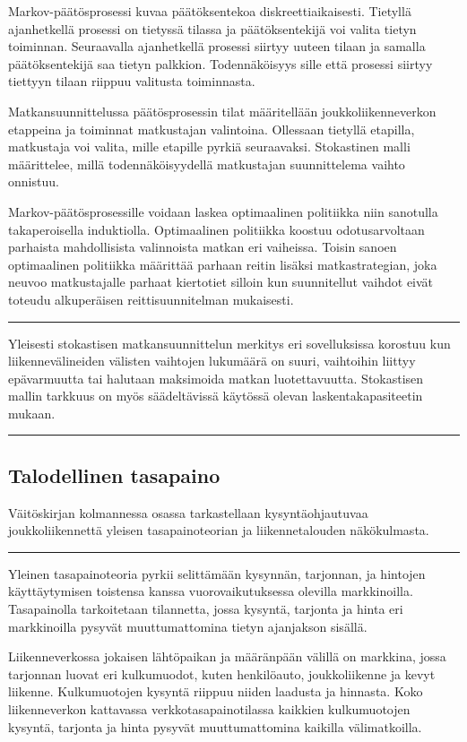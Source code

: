 \documentclass[a4paper,12pt]{article}
\newcommand*\sepline{%
  \begin{center}
    \rule[1ex]{.5\textwidth}{.5pt}
  \end{center}}
\begin{document}
Markov-päätösprosessi kuvaa päätöksentekoa diskreettiaikaisesti. Tietyllä ajanhetkellä prosessi on tietyssä tilassa ja 
päätöksentekijä voi valita tietyn toiminnan. Seuraavalla ajanhetkellä
prosessi siirtyy uuteen tilaan ja samalla päätöksentekijä saa tietyn palkkion.
Todennäköisyys sille että prosessi siirtyy tiettyyn tilaan riippuu valitusta toiminnasta. 

Matkansuunnittelussa päätösprosessin tilat määritellään joukkoliikenneverkon etappeina ja toiminnat matkustajan valintoina.
Ollessaan tietyllä etapilla, matkustaja voi valita, mille etapille pyrkiä seuraavaksi. 
Stokastinen malli määrittelee, millä todennäköisyydellä matkustajan suunnittelema vaihto onnistuu.

Markov-päätösprosessille voidaan laskea optimaalinen politiikka niin sanotulla takaperoisella induktiolla. Optimaalinen politiikka
koostuu odotusarvoltaan parhaista mahdollisista valinnoista matkan eri vaiheissa. Toisin sanoen optimaalinen politiikka 
määrittää parhaan reitin lisäksi matkastrategian, joka neuvoo matkustajalle parhaat kiertotiet silloin kun 
suunnitellut vaihdot eivät toteudu alkuperäisen reittisuunnitelman mukaisesti.

\sepline

Yleisesti stokastisen matkansuunnittelun merkitys eri sovelluksissa korostuu kun liikennevälineiden välisten vaihtojen lukumäärä on suuri, 
vaihtoihin liittyy epävarmuutta tai halutaan maksimoida matkan luotettavuutta. Stokastisen mallin tarkkuus on myös säädeltävissä
käytössä olevan laskentakapasiteetin mukaan.

\sepline


\subsection*{Talodellinen tasapaino}
Väitöskirjan kolmannessa osassa tarkastellaan kysyntäohjautuvaa joukkoliikennettä yleisen tasapainoteorian ja liikennetalouden näkökulmasta.

\sepline

Yleinen tasapainoteoria pyrkii selittämään kysynnän, tarjonnan, ja hintojen käyttäytymisen toistensa kanssa vuorovaikutuksessa
olevilla markkinoilla. Tasapainolla tarkoitetaan tilannetta, jossa kysyntä, tarjonta ja hinta eri markkinoilla pysyvät muuttumattomina
tietyn ajanjakson sisällä.

Liikenneverkossa jokaisen lähtöpaikan ja määränpään välillä on markkina, jossa tarjonnan luovat eri kulkumuodot, 
kuten henkilöauto, joukkoliikenne ja kevyt liikenne.
Kulkumuotojen kysyntä riippuu niiden laadusta ja hinnasta. Koko liikenneverkon kattavassa verkkotasapainotilassa kaikkien kulkumuotojen
kysyntä, tarjonta ja hinta pysyvät muuttumattomina kaikilla välimatkoilla. 
\end{document}
